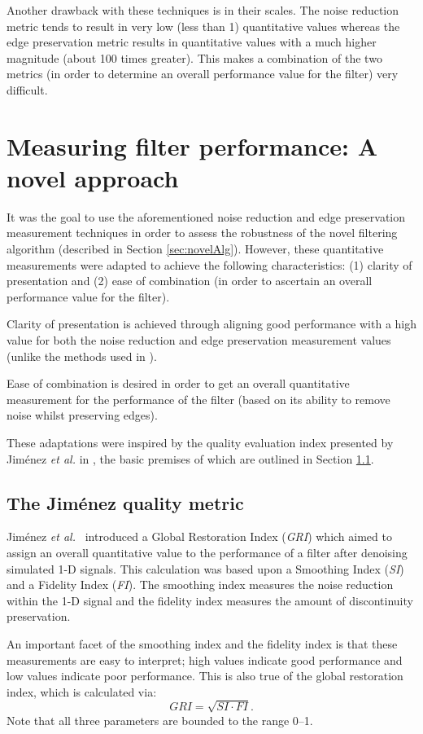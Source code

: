 \documentclass[12pt]{report}
\begin{document}
Another drawback with these techniques is in their scales. The noise reduction metric
tends to result in very low (less than 1) quantitative values whereas the 
edge preservation metric results in quantitative values with a much higher magnitude
(about 100 times greater).
This makes a combination of the two metrics (in order to determine an overall 
performance value for the filter) very difficult.

\section{Measuring filter performance: A novel approach}
\label{ourAdapt}
It was the goal to use the aforementioned noise reduction and edge preservation
measurement techniques in order to assess the robustness of the novel filtering algorithm
(described in Section  \ref{sec:novelAlg}). However, these quantitative 
measurements were adapted to achieve the following characteristics:
(1) clarity of presentation and (2) ease of combination (in order to ascertain an overall
        performance value for the filter).

Clarity of presentation is achieved through aligning good performance
with a high value for both the noise
reduction and edge preservation measurement values
(unlike the methods used in \cite{yu96, lee94}).

Ease of combination is desired in order to get an overall quantitative
measurement for the performance of the filter (based on its ability to
remove noise whilst preserving edges). 

These adaptations were inspired by the quality evaluation index presented 
by Jim\'enez \emph{et al.} in \cite{jim2001}, the basic premises of which
are outlined in Section \ref{subsec:jim}.


\subsection{The Jim\'enez quality metric}
\label{subsec:jim}
Jim\'enez \emph{et al.}~\cite{jim2001} introduced a Global Restoration 
Index (\emph{GRI}) which aimed to assign an overall quantitative value to the performance
of a filter after denoising simulated 1-D signals. 
This calculation was based upon a Smoothing Index (\emph{SI}) and a 
Fidelity Index (\emph{FI}). The smoothing index measures the noise 
reduction within the 1-D signal and the fidelity index measures 
the amount of discontinuity preservation. 

An important facet of the smoothing index and the fidelity index is that 
these measurements are easy to interpret; 
high values indicate good performance and low values indicate poor performance.
This is also true of the global restoration index, which is calculated via:
\begin{equation}
	GRI = \sqrt{SI \cdot FI}.
\end{equation}
Note that all three parameters are bounded to the range 0--1.
\end{document}
